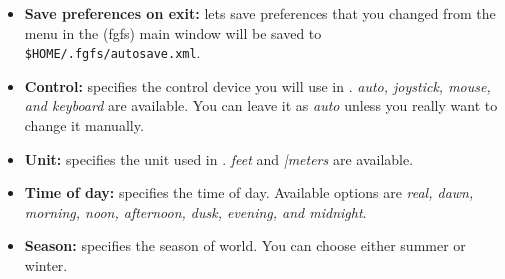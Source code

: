 \begin{itemize}
\item \textbf{Save preferences on exit:} lets \FlightGear{} save preferences that you changed from the menu in the \FlightGear{} (fgfs) main window will be saved to \\ \texttt{\$HOME/.fgfs/autosave.xml}.
\item \textbf{Control:} specifies the control device you will use in \FlightGear{}. \textit{auto, joystick, mouse, and keyboard} are available. You can leave it as \textit{auto} unless you really want to change it manually.
\item \textbf{Unit:} specifies the unit used in \FlightGear{}. \textit{feet} and \textit{|meters} are available.
\item \textbf{Time of day:} specifies the time of day. Available options are \textit{real, dawn, morning, noon, afternoon, dusk, evening, and midnight}.
\item \textbf{Season:} specifies the season of \FlightGear{} world. You can choose either summer or winter.


\end{itemize}
